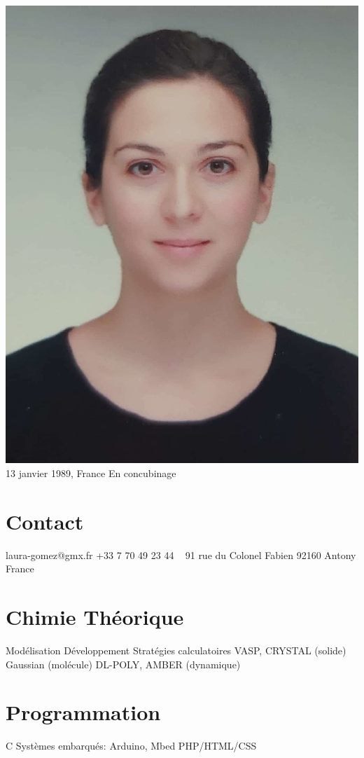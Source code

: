 \documentclass{cv-style}     %
\begin{document}


\begin{aside}
    \includegraphics[width=.8\columnwidth]{img/LG}
    13 janvier 1989, France
    En concubinage
    \section{Contact}
    laura-gomez@gmx.fr
    +33 7 70 49 23 44
    ~
    91 rue du Colonel Fabien
    92160 Antony
    France
    \section{Chimie Théorique}
    Modélisation
    Développement
    Stratégies calculatoires
    VASP, CRYSTAL (solide)
    Gaussian (molécule)
    DL-POLY, AMBER (dynamique)
    \section{Programmation}
    C
    Systèmes embarqués: Arduino, Mbed
    PHP/HTML/CSS

\end{aside}
\end{document}
